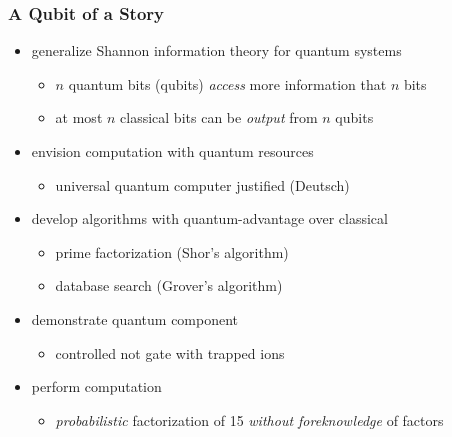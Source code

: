 \begin{frame}
  \frametitle{A Qubit of a Story}
  
  \begin{itemize}[<+->]
  \item generalize Shannon information theory for quantum systems 
    \begin{itemize}[<6->]
    \item $n$ quantum bits (qubits) \emph{access} more information that $n$
      bits
    \item at most $n$ classical bits can be \emph{output} from $n$ qubits
    \end{itemize}
  \item envision computation with quantum resources 
    \begin{itemize}[<6->]
    \item universal quantum computer justified (Deutsch) 
    \end{itemize}
  \item develop algorithms with quantum-advantage over classical 
    \begin{itemize}[<6->]
    \item prime factorization (Shor's algorithm) 
    \item database search (Grover's algorithm)
    \end{itemize}
  \item demonstrate quantum component 
    \begin{itemize}[<6->]
    \item controlled not gate with trapped ions 
    \end{itemize}
  \item perform computation 
    \begin{itemize}[<6->]
    \item \textcolor{orange!80!black}{\emph{probabilistic} factorization of \num{15} \emph{without foreknowledge} of factors}
    \end{itemize}
  \end{itemize}
\end{frame}
